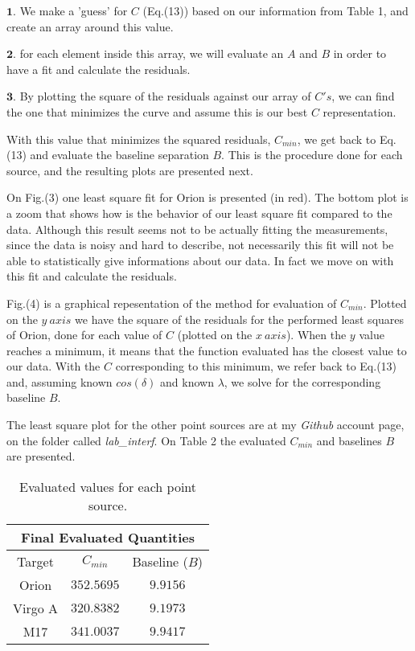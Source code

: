\documentclass{article}
\begin{document}
$\mathbf{1.}$ We make a 'guess' for $C$ (Eq.(13)) based on our
information from Table 1, and create an array around this value.

$\mathbf{2.}$ for each element inside this array, we will evaluate an
$A$ and $B$ in order to have a fit and calculate the residuals.

$\mathbf{3.}$ By plotting the square of the residuals against our array
of $C's$, we can find the one that minimizes the curve and assume this is
our best $C$ representation.

With this value that minimizes the squared residuals, $C_{min}$, we get
back to Eq.(13) and evaluate the baseline separation $B$. This is the
procedure done for each source, and the resulting plots are presented next.

On Fig.(3) one least square fit for Orion is presented (in red). The
bottom plot is a zoom that shows how is the behavior of our least square
fit compared to the data. Although this
result seems not to be actually fitting the measurements, since the data
is noisy and hard to describe, not necessarily this fit will not be able to
statistically give informations about our data. In fact we move on with
this fit and calculate the residuals.

Fig.(4) is a graphical repesentation of the method for evaluation of
$C_{min}$. Plotted on the $y \ axis$ we have the square of the residuals
for the performed least squares of Orion, done for each value of $C$
(plotted on the $x \ axis$). When the $y$ value reaches a minimum, it
means that the function evaluated has the closest value to our
data. With the $C$ corresponding to this minimum, we refer back to
Eq.(13) and, assuming known $cos(\delta)$ and known $\lambda$, we solve
for the corresponding baseline $B$. 

The least square plot for the other point sources are at my
\emph{Github} account page, on the folder called
\emph{lab\_interf}. On Table 2 the evaluated $C_{min}$ and baselines $B$
are presented.

\begin{table}[H]
\center
\begin{tabular}{|c|c|c|}
\hline
\multicolumn{3}{|c|}{Final Evaluated Quantities}\\
\hline
Target    & $C_{min}$ &  Baseline ($B$)   \\ 
\hline
Orion &  $352.5695$ & $9.9156$ \\ 
Virgo A & $320.8382$  & $9.1973$ \\
M17 & $341.0037$ & $9.9417$ \\ 
\hline
\end{tabular}
\caption{Evaluated values for each point source.} 
\label{tab:1}
\end{table}
\end{document}
